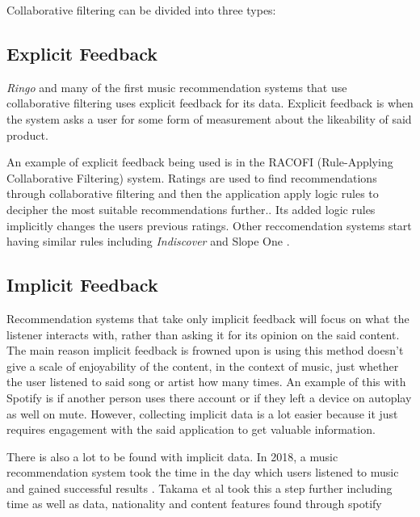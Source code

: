 Collaborative filtering can be divided into three types:




\subsection{Explicit Feedback}

\textit{Ringo} and many of the first music recommendation systems that use collaborative filtering uses explicit feedback for its data. Explicit feedback is when the system asks a user for some form of measurement about the likeability of said product. \citep{celma_recommendation_2010}

An example of explicit feedback being used is in the RACOFI (Rule-Applying Collaborative Filtering) system. Ratings are used to find recommendations through collaborative filtering and then the application apply logic rules to decipher the most suitable recommendations further.\citep{anderson_racofi_2003}. Its added logic rules implicitly changes the users previous ratings. Other reccomendation systems start having similar rules including \textit{Indiscover} and Slope One \citep{celma_music_2010} \citep{lemire_slope_2007}.

\subsection{Implicit Feedback}

Recommendation systems that take only implicit feedback will focus on what the listener interacts with, rather than asking it for its opinion on the said content. The main reason implicit feedback is frowned upon is using this method doesn't give a scale of enjoyability of the content, in the context of music, just whether the user listened to said song or artist how many times. An example of this with Spotify is if another person uses there account or if they left a device on autoplay as well on mute. However, collecting implicit data is a lot easier because it just requires engagement with the said application to get valuable information. 

There is also a lot to be found with implicit data. In 2018, a music recommendation system took the time in the day which users listened to music and gained successful results \citep{sanchez-moreno_incorporating_2018}. Takama et al took this a step further including time as well as data, nationality and content features found through spotify \citep{takama_context-aware_2021} 

